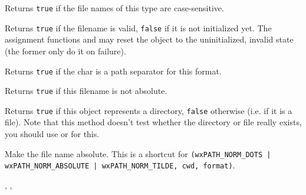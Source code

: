 
Returns {\tt true} if the file names of this type are case-sensitive.


\label{wxfilenameisok}


Returns {\tt true} if the filename is valid, {\tt false} if it is not
initialized yet. The assignment functions and
 may reset the object to the uninitialized,
invalid state (the former only do it on failure).


\label{wxfilenameispathseparator}


Returns {\tt true} if the char is a path separator for this format.


\label{wxfilenameisrelative}


Returns {\tt true} if this filename is not absolute.


\label{wxfilenameisdir}


Returns {\tt true} if this object represents a directory, {\tt false} otherwise
(i.e. if it is a file). Note that this method doesn't test whether the
directory or file really exists, you should use 
 or 
 for this.


\label{wxfilenamemakeabsolute}


Make the file name absolute. This is a shortcut for
{\tt {}(wxPATH\_NORM\_DOTS | wxPATH\_NORM\_ABSOLUTE | wxPATH\_NORM\_TILDE, cwd, format)}.


,
,


